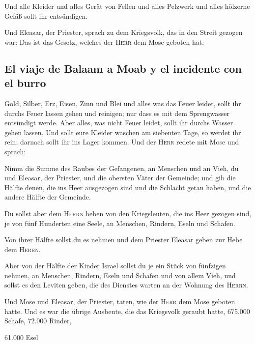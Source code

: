  Und alle Kleider und alles Gerät von Fellen und alles
Pelzwerk und alles hölzerne Gefäß sollt ihr entsündigen.

 Und Eleasar, der Priester, sprach zu dem Kriegsvolk, das
in den Streit gezogen war: Das ist das Gesetz, welches der \textsc{Herr}
dem Mose geboten hat:

\hypertarget{el-viaje-de-balaam-a-moab-y-el-incidente-con-el-burro}{%
\subsection{El viaje de Balaam a Moab y el incidente con el
burro}\label{el-viaje-de-balaam-a-moab-y-el-incidente-con-el-burro}}

 Gold, Silber, Erz, Eisen, Zinn und Blei 
und alles was das Feuer leidet, sollt ihr durchs Feuer lassen gehen und
reinigen; nur dass es mit dem Sprengwasser entsündigt werde. Aber alles,
was nicht Feuer leidet, sollt ihr durchs Wasser gehen lassen.
 Und sollt eure Kleider waschen am siebenten Tage, so
werdet ihr rein; darnach sollt ihr ins Lager kommen.  Und
der \textsc{Herr} redete mit Mose und sprach:

 Nimm die Summe des Raubes der Gefangenen, an Menschen
und an Vieh, du und Eleasar, der Priester, und die obersten Väter der
Gemeinde;  und gib die Hälfte denen, die ins Heer
ausgezogen sind und die Schlacht getan haben, und die andere Hälfte der
Gemeinde.

 Du sollst aber dem \textsc{Herrn} heben von den
Kriegsleuten, die ins Heer gezogen sind, je von fünf Hunderten eine
Seele, an Menschen, Rindern, Eseln und Schafen.

 Von ihrer Hälfte sollst du es nehmen und dem Priester
Eleasar geben zur Hebe dem \textsc{Herrn}.

 Aber von der Hälfte der Kinder Israel sollst du je ein
Stück von fünfzigen nehmen, an Menschen, Rindern, Eseln und Schafen und
von allem Vieh, und sollst es den Leviten geben, die des Dienstes warten
an der Wohnung des \textsc{Herrn}.

 Und Mose und Eleasar, der Priester, taten, wie der
\textsc{Herr} dem Mose geboten hatte.  Und es war die
übrige Ausbeute, die das Kriegsvolk geraubt hatte, 675.000 Schafe,
 72.000 Rinder,

 61.000 Esel

